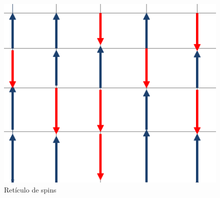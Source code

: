 \documentclass[a4paper]{article}
\begin{document}
\begin{figure}[H]
\begin{center}
\includegraphics[scale=0.4]{LatticeIsing.png} 
\end{center} 
\caption{Retículo de spins}
\end{figure}
\end{document}
